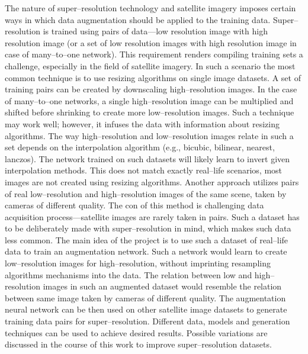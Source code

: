 The nature of super--resolution technology and satellite imagery imposes certain
ways in which data augmentation should be applied to the training data.
Super--resolution is trained using pairs of data---low resolution image with
high resolution image (or a set of low resolution images with high resolution
image in case of many--to--one network).
This requirement renders compiling training sets a challenge, especially in the
field of satellite imagery.
In such a scenario the most common technique is to use resizing algorithms on
single image datasets.
A set of training pairs can be created by downscaling high--resolution images.
In the case of many--to--one networks, a single high--resolution image can be
multiplied and shifted before shrinking to create more low--resolution images.
Such a technique may work well; however, it infuses the data with information
about resizing algorithms.
The way high--resolution and low--resolution images relate in such a set
depends on the interpolation algorithm (e.g., bicubic, bilinear,
nearest, lanczos).
The network trained on such datasets will likely learn to invert given
interpolation methods.
This does not match exactly real--life scenarios, most images are not created
using resizing algorithms.
Another approach utilizes pairs of real low--resolution and high--resolution
images of the same scene, taken by cameras of different quality.
The con of this method is challenging data acquisition process---satellite
images are rarely taken in pairs.
Such a dataset has to be deliberately made with super--resolution in mind,
which makes such data less common.
The main idea of the project is to use such a dataset of real--life data to
train an augmentation network.
Such a network would learn to create low--resolution images for
high--resolution, without imprinting resampling algorithms mechanisms into the
data.
The relation between low and high--resolution images in such an augmented
dataset would resemble the relation between same image taken by cameras of
different quality. 
The augmentation neural network can be then used on other satellite image
datasets to generate training data pairs for super--resolution.
Different data, models and generation techniques can be used to achieve desired
results.
Possible variations are discussed in the course of this work to improve
super--resolution datasets.